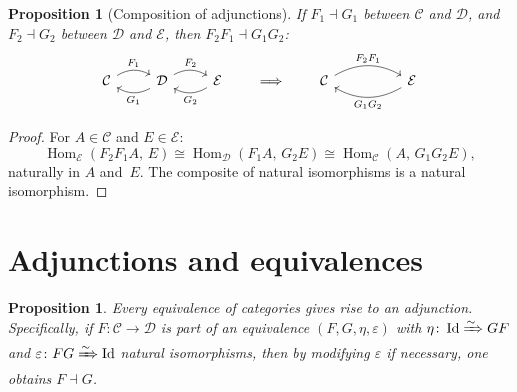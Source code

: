 \documentclass[a4paper,12pt]{book}
\DeclareMathOperator{\Hom}{Hom}
\DeclareMathOperator{\Id}{Id}
\theoremstyle{definition}
\theoremstyle{plain}
\newtheorem{proposition}[definition]{Proposition}
\theoremstyle{remark}
\begin{document}
\begin{proposition}[Composition of adjunctions]\label{prop:adj-compose}
If $F_1\dashv G_1$ between $\mathcal{C}$ and $\mathcal{D}$,
and $F_2\dashv G_2$ between $\mathcal{D}$ and $\mathcal{E}$, then
$F_2 F_1 \dashv G_1 G_2$:
\[
\begin{tikzcd}
\mathcal{C}
  \arrow[r, bend left, "F_1"]
& \mathcal{D}
  \arrow[l, bend left, "G_1"]
  \arrow[r, bend left, "F_2"]
& \mathcal{E}
  \arrow[l, bend left, "G_2"]
\end{tikzcd}
\qquad\Longrightarrow\qquad
\begin{tikzcd}
\mathcal{C}
  \arrow[rr, bend left, "F_2 F_1"]
& &
\mathcal{E}
  \arrow[ll, bend left, "G_1 G_2"]
\end{tikzcd}
\]
\end{proposition}

\begin{proof}
For $A\in\mathcal{C}$ and $E\in\mathcal{E}$:
\[
    \Hom_\mathcal{E}(F_2 F_1 A,\, E)
    \cong \Hom_\mathcal{D}(F_1 A,\, G_2 E)
    \cong \Hom_\mathcal{C}(A,\, G_1 G_2 E),
\]
naturally in $A$ and~$E$.  The composite of natural isomorphisms is
a natural isomorphism.
\end{proof}


\section{Adjunctions and equivalences}\label{sec:adj-equiv}

\begin{proposition}\label{prop:equiv-is-adjunction}
Every equivalence of categories gives rise to an adjunction.
Specifically, if $F\colon\mathcal{C}\to\mathcal{D}$ is part of an
equivalence $(F,G,\eta,\varepsilon)$ with $\eta\colon\Id\xRightarrow{\sim}GF$
and $\varepsilon\colon FG\xRightarrow{\sim}\Id$ natural isomorphisms,
then by modifying $\varepsilon$ if necessary, one obtains $F\dashv G$.
\end{proposition}
\end{document}
